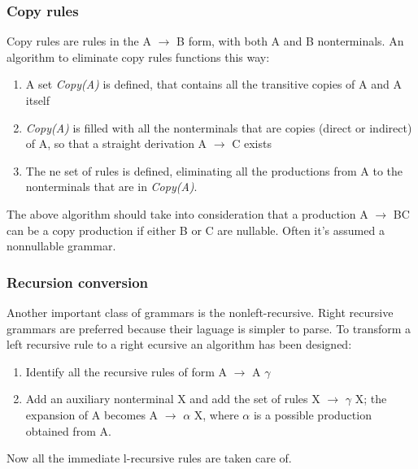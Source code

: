 		\subsubsection{Copy rules}
			Copy rules are rules in the A $\rightarrow$ B form, with both A and B nonterminals. An algorithm to eliminate copy rules functions this way:
			\begin{enumerate}
				\item A set \emph{Copy(A)} is defined, that contains all the transitive copies of A and A itself
				\item \emph{Copy(A)} is filled with all the nonterminals that are copies (direct or indirect) of A, so that a straight derivation A $\rightarrow$ C exists
				\item The ne set of rules is defined, eliminating all the productions from A to the nonterminals that are in \emph{Copy(A)}.  
			\end{enumerate}
			The above algorithm should take into consideration that a production A $\rightarrow$ BC can be a copy production if either B or C are nullable. Often it's assumed a nonnullable grammar.
		\subsubsection{Recursion conversion}
			Another important class of grammars is the nonleft-recursive. Right recursive grammars are preferred because their laguage is simpler to parse. To transform a left recursive rule to a right ecursive an algorithm has been designed:
			\begin{enumerate}
				\item Identify all the recursive rules of form A $\rightarrow$ A $\gamma$
				\item Add an auxiliary nonterminal X and add the set of rules X $\rightarrow$ $\gamma$ X; the expansion of A becomes A $\rightarrow$ $\alpha$ X, where $\alpha$ is a possible production obtained from A.
			\end{enumerate}
			Now all the immediate l-recursive rules are taken care of.\\
